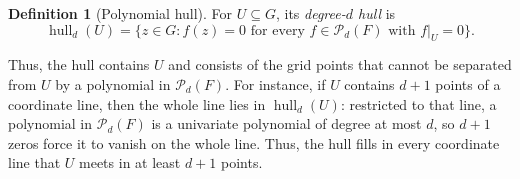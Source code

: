 \documentclass[11pt,letterpaper]{article}
\theoremstyle{definition}
\newtheorem{definition}[theorem]{Definition}
\theoremstyle{remark}
\begin{document}
\begin{definition}[Polynomial hull]
\label{def:degree-hull}
For $U\subseteq G$, its \emph{degree-$d$ hull} is
\[
\operatorname{hull}_d(U)
 =\{z\in G:f(z)=0\text{ for every }f\in\mathcal P_d(F)
                  \text{ with }f|_U=0\}.
\]
\end{definition}

Thus, the hull contains $U$ and consists of the grid points that
cannot be separated from $U$ by a polynomial in $\mathcal P_d(F)$.
For instance, if $U$ contains $d+1$ points of a coordinate line, then
the whole line lies in $\operatorname{hull}_d(U)$: restricted to that
line, a polynomial in $\mathcal P_d(F)$ is a univariate polynomial of
degree at most $d$, so $d+1$ zeros force it to vanish on the whole
line. Thus, the hull fills in every coordinate line that $U$ meets in at least
$d+1$ points.
\end{document}
